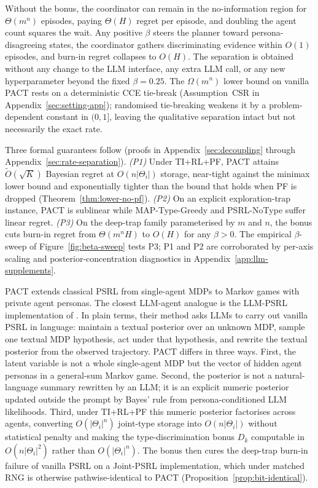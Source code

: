 \documentclass{article}
\begin{document}
Without the bonus, the coordinator can remain in the no-information region for $\Theta(m^n)$ episodes, paying $\Theta(H)$ regret per episode, and doubling the agent count squares the wait. Any positive $\beta$ steers the planner toward persona-disagreeing states, the coordinator gathers discriminating evidence within $O(1)$ episodes, and burn-in regret collapses to $O(H)$. The separation is obtained without any change to the LLM interface, any extra LLM call, or any new hyperparameter beyond the fixed $\beta=0.25$. The $\Omega(m^n)$ lower bound on vanilla PACT rests on a deterministic CCE tie-break (Assumption~CSR in Appendix~\ref{sec:setting-app}); randomised tie-breaking weakens it by a problem-dependent constant in $(0,1]$, leaving the qualitative separation intact but not necessarily the exact rate.

Three formal guarantees follow (proofs in Appendix~\ref{sec:decoupling} through Appendix~\ref{sec:rate-separation}). \emph{(P1)} Under TI+RL+PF, PACT attains $\tilde O(\sqrt K)$ Bayesian regret at $O(n|\Theta_i|)$ storage, near-tight against the minimax lower bound and exponentially tighter than the bound that holds when PF is dropped (Theorem~\ref{thm:lower-no-pf}). \emph{(P2)} On an explicit exploration-trap instance, PACT is sublinear while MAP-Type-Greedy and PSRL-NoType suffer linear regret. \emph{(P3)} On the deep-trap family parameterised by $m$ and $n$, the bonus cuts burn-in regret from $\Theta(m^n H)$ to $O(H)$ for any $\beta>0$. The empirical $\beta$-sweep of Figure~\ref{fig:beta-sweep} tests P3; P1 and P2 are corroborated by per-axis scaling and posterior-concentration diagnostics in Appendix~\ref{app:llm-supplements}.

PACT extends classical PSRL \citep{strens2000bayesian,osband2013more} from single-agent MDPs to Markov games with private agent personas. The closest LLM-agent analogue is the LLM-PSRL implementation of \citet{arumugamgriffiths2026exploration}. In plain terms, their method asks LLMs to carry out vanilla PSRL in language: maintain a textual posterior over an unknown MDP, sample one textual MDP hypothesis, act under that hypothesis, and rewrite the textual posterior from the observed trajectory. PACT differs in three ways. First, the latent variable is not a whole single-agent MDP but the vector of hidden agent personas in a general-sum Markov game. Second, the posterior is not a natural-language summary rewritten by an LLM; it is an explicit numeric posterior updated outside the prompt by Bayes' rule from persona-conditioned LLM likelihoods. Third, under TI+RL+PF this numeric posterior factorises across agents, converting $O(|\Theta_i|^n)$ joint-type storage into $O(n|\Theta_i|)$ without statistical penalty and making the type-discrimination bonus $D_k$ computable in $O(n|\Theta_i|^2)$ rather than $O(|\Theta_i|^n)$. The bonus then cures the deep-trap burn-in failure of vanilla PSRL on a Joint-PSRL implementation, which under matched RNG is otherwise pathwise-identical to PACT (Proposition~\ref{prop:bit-identical}).
\end{document}
